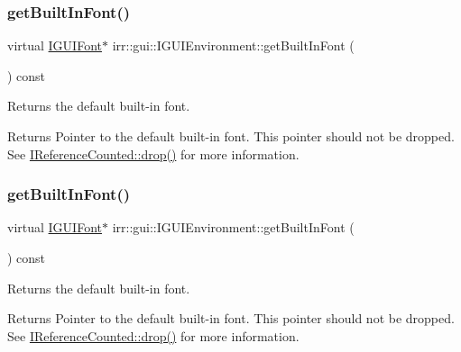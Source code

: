 \subsubsection{\texorpdfstring{get\+Built\+In\+Font()}{getBuiltInFont()}\hspace{0.1cm}{\footnotesize\ttfamily [1/2]}}
{\footnotesize\ttfamily virtual \hyperlink{classirr_1_1gui_1_1IGUIFont}{I\+G\+U\+I\+Font}$\ast$ irr\+::gui\+::\+I\+G\+U\+I\+Environment\+::get\+Built\+In\+Font (\begin{DoxyParamCaption}{ }\end{DoxyParamCaption}) const\hspace{0.3cm}{\ttfamily [pure virtual]}}



Returns the default built-\/in font. 

\begin{DoxyReturn}{Returns}
Pointer to the default built-\/in font. This pointer should not be dropped. See \hyperlink{classirr_1_1IReferenceCounted_a03856a09355b89d178090c4a5f738543}{I\+Reference\+Counted\+::drop()} for more information. 
\end{DoxyReturn}
\mbox{\label{classirr_1_1gui_1_1IGUIEnvironment_a896fbfcbad5ccf187a835827b439da93}} 
\subsubsection{\texorpdfstring{get\+Built\+In\+Font()}{getBuiltInFont()}\hspace{0.1cm}{\footnotesize\ttfamily [2/2]}}
{\footnotesize\ttfamily virtual \hyperlink{classirr_1_1gui_1_1IGUIFont}{I\+G\+U\+I\+Font}$\ast$ irr\+::gui\+::\+I\+G\+U\+I\+Environment\+::get\+Built\+In\+Font (\begin{DoxyParamCaption}{ }\end{DoxyParamCaption}) const\hspace{0.3cm}{\ttfamily [pure virtual]}}



Returns the default built-\/in font. 

\begin{DoxyReturn}{Returns}
Pointer to the default built-\/in font. This pointer should not be dropped. See \hyperlink{classirr_1_1IReferenceCounted_a03856a09355b89d178090c4a5f738543}{I\+Reference\+Counted\+::drop()} for more information. 
\end{DoxyReturn}
\mbox{\label{classirr_1_1gui_1_1IGUIEnvironment_a13ec41a31e1b9cdc317c0c6092c2b820}} 
